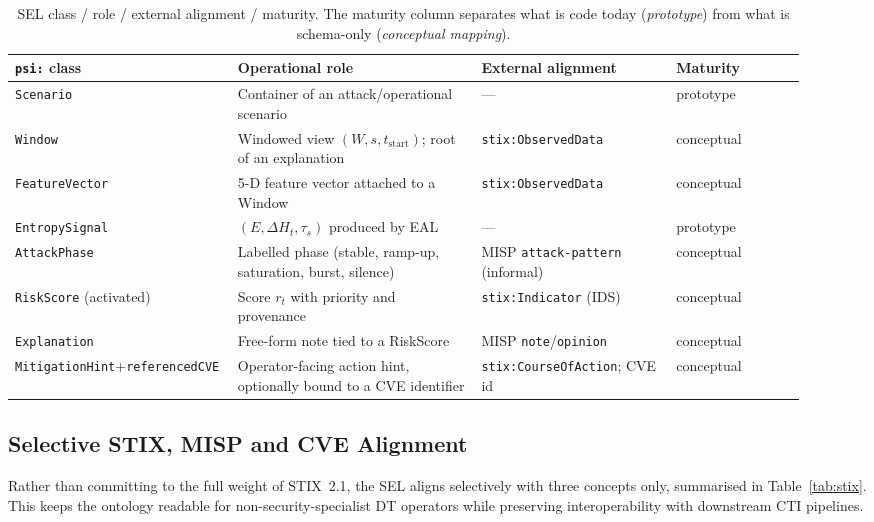 \documentclass[runningheads]{llncs}
\newcommand{\EntropyDeviation}{\ensuremath{\Delta H}}
\newcommand{\taus}{\ensuremath{\tau_{s}}}
\begin{document}
\begin{table}[t]
\centering
\caption{SEL class / role / external alignment / maturity. The maturity
column separates what is code today (\emph{prototype}) from what is
schema-only (\emph{conceptual mapping}).}
\label{tab:sel-maturity}
\small
\begin{tabular}{@{}p{0.22\linewidth}p{0.30\linewidth}p{0.24\linewidth}p{0.16\linewidth}@{}}
\toprule
\textbf{\texttt{psi:} class} & \textbf{Operational role}
  & \textbf{External alignment} & \textbf{Maturity} \\
\midrule
\texttt{Scenario}        & Container of an attack/operational scenario
  & ---                                  & prototype \\
\texttt{Window}          & Windowed view $(W, s, t_{\mathrm{start}})$;
                          root of an explanation
  & \texttt{stix:ObservedData}           & conceptual \\
\texttt{FeatureVector}   & 5-D feature vector attached to a Window
  & \texttt{stix:ObservedData}           & conceptual \\
\texttt{EntropySignal}   & $(E, \EntropyDeviation_t, \taus)$ produced by EAL
  & ---                                  & prototype \\
\texttt{AttackPhase}     & Labelled phase (stable, ramp-up, saturation,
                          burst, silence)
  & MISP \texttt{attack-pattern} (informal) & conceptual \\
\texttt{RiskScore} (activated) & Score $r_t$ with priority and
                          provenance
  & \texttt{stix:Indicator} (IDS)        & conceptual \\
\texttt{Explanation}     & Free-form note tied to a RiskScore
  & MISP \texttt{note}/\texttt{opinion}  & conceptual \\
\texttt{MitigationHint}+\texttt{referencedCVE}
                         & Operator-facing action hint, optionally
                          bound to a CVE identifier
  & \texttt{stix:CourseOfAction}; CVE id & conceptual \\
\bottomrule
\end{tabular}
\end{table}

\subsection{Selective STIX, MISP and CVE Alignment}

Rather than committing to the full weight of STIX~2.1, the SEL aligns
selectively with three concepts only, summarised in Table~\ref{tab:stix}.
This keeps the ontology readable for non-security-specialist DT
operators while preserving interoperability with downstream CTI
pipelines.
\end{document}
